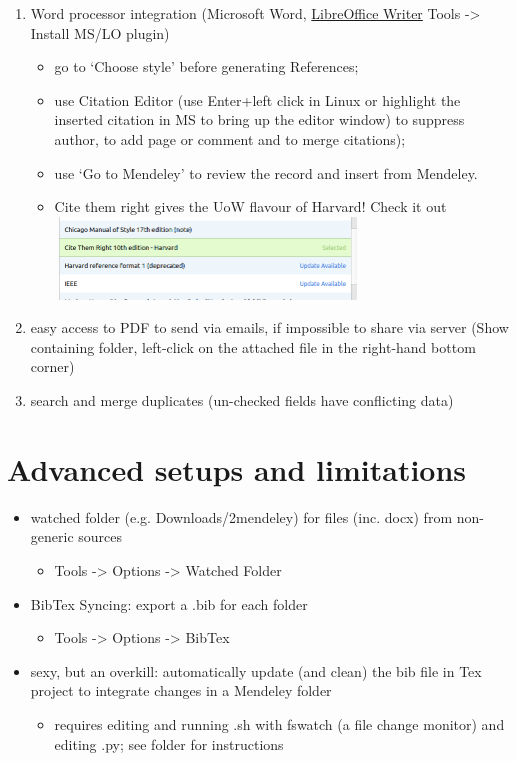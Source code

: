 \documentclass[a4paper,11pt]{article}
\makeatletter
\newcommand\HREF[2]{\hyper@linkurl{#2}{#1}}
\makeatother
\begin{document}
\begin{enumerate}
	\item Word processor integration (Microsoft Word, \href{run:.LibreOffice_plugin_demo.odt}{LibreOffice Writer} Tools -> Install MS/LO plugin)
		\begin{itemize}
		\item go to `Choose style' before generating References;
		\item use Citation Editor (use Enter+left click in Linux or highlight the inserted citation in MS to bring up the editor window) to suppress author, to add page or comment and to merge citations);  
		\item use `Go to Mendeley' to review the record and insert from Mendeley.
		\item Cite them right gives the UoW flavour of Harvard! Check it out \\
		\includegraphics[width=80mm]{pics/cite_them_right.png}%
	\end{itemize}
    \item easy access to PDF to send via emails, if impossible to share via server (Show containing folder, left-click on the attached file in the right-hand bottom corner)
    \item search and merge duplicates (un-checked fields have conflicting data)
\end{enumerate}

\section{Advanced setups and limitations}

\begin{itemize}
	\item watched folder (e.g. Downloads/2mendeley) for files (inc. docx) from non-generic sources
		\begin{itemize}
			\item Tools -> Options -> Watched Folder
		\end{itemize}
	\item BibTex Syncing: export a .bib for each folder
		\begin{itemize}
			\item Tools -> Options -> BibTex
		\end{itemize}
	\item sexy, but an overkill: automatically update (and clean) the bib file in Tex project to integrate changes in a Mendeley folder
	\begin{itemize}
		\item requires editing and running .sh with fswatch (a file change monitor) and editing .py; see \HREF{./manage\_bib/}{manage\_bib} folder for instructions
	\end{itemize}
	
\end{itemize}
\end{document}
